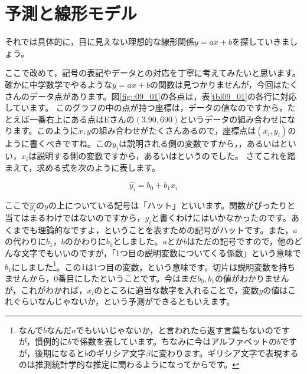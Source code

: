 \documentclass{ltjbook}
\begin{document}
\section{予測と線形モデル}

それでは具体的に，目に見えない理想的な線形関係$y=ax+b$を探していきましょう。

ここで改めて，記号の表記やデータとの対応を丁寧に考えてみたいと思います。確かに中学数学でやるような$y=ax+b$の関数は見つかりませんが，今回はたくさんのデータ点があります。図\ref{fig::09_01}の各点は，表\ref{tbl09_01}の各行に対応しています。
このグラフの中の点が持つ座標は，データの値なのですから，たとえば一番右上にある点はEさんの$(3.90,690)$というデータの組み合わせになります。このように$x,y$の組み合わせがたくさんあるので，座標点は$(x_i,y_i)$のように書くべきですね。この$y_i$は説明される側の変数ですから，，あるいはといい，$x_i$は説明する側の変数ですから，あるいはというのでした。
さてこれを踏まえて，求める式を次のように表します。

\[ \hat{y_i} = b_0 + b_1 x_i \]

ここで$\hat{y_i}$の$y$の上についている記号は「ハット」といいます。関数がぴったりと当てはまるわけではないのですから，$y_i$と書くわけにはいかなかったのです。あくまでも理論的なですよ，ということを表すための記号がハットです。また，$a$の代わりに$b_1$，$b$のかわりに$b_0$としました。$a$とか$b$はただの記号ですので，他のどんな文字でもいいのですが，「1つ目の説明変数についてくる係数」という意味で$b_1$にしました\footnote{なんで$b$なんだ$a$でもいいじゃないか，と言われたら返す言葉もないのですが，慣例的に$b$で係数を表しています。ちなみに今はアルファベットの$b$ですが，後期になると$b$のギリシア文字$\beta$に変わります。ギリシア文字で表現するのは推測統計学的な推定に関わるようになってからです。}。この$1$は1つ目の変数，という意味です。切片は説明変数を持ちませんから，0番目にしたということです。今はまだ$b_0, b_1$の値がわかりませんが，これがわかれば，$x_i$のところに適当な数字を入れることで，変数$y$の値はこれぐらいなんじゃないか，という予測ができるともいえます。
\end{document}
